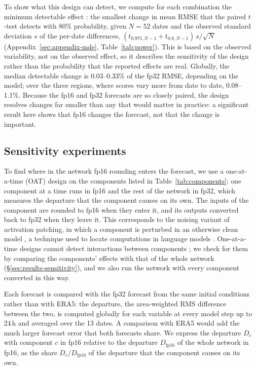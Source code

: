 To show what this design can detect, we compute for each combination
the minimum detectable effect \citep{bloom1995minimum,cohen1988statistical}:
the smallest change in mean RMSE that the paired $t$-test detects with
80\% probability, given $N=52$ dates and the observed standard deviation
$s$ of the per-date differences, $(t_{0.975,N-1}+t_{0.8,N-1})\,s/\sqrt{N}$
(Appendix~\ref{sec:appendix-mde}, Table~\ref{tab:power}). This is based on the observed variability, not
on the observed effect, so it describes the sensitivity of the design
rather than the probability that the reported effects are real.
Globally, the median detectable change is 0.03--0.33\% of the fp32 RMSE,
depending on the model; over the three regions, where scores vary more
from date to date, 0.08--1.1\%. Because the fp16 and fp32 forecasts are
so closely paired, the design resolves changes far smaller than any that
would matter in practice: a significant result here shows that fp16
changes the forecast, not that the change is important.



\subsection{Sensitivity experiments}
\label{sec:methods-tier2}

To find where in the network fp16 rounding enters the forecast, we
use a one-at-a-time (OAT) design on the components listed in
Table~\ref{tab:components}: one component at a time runs in fp16 and the
rest of the network in fp32, which measures the departure that the
component causes on its own. The inputs of the component are rounded to
fp16 when they enter it, and its outputs converted back to fp32 when they
leave it. This corresponds to the noising variant of activation patching, in which a
component is perturbed in an otherwise clean model
\citep{heimersheim2024activation}, a technique used to locate computations
in language models \citep{meng2022locating}. One-at-a-time designs cannot detect
interactions between components \citep{saltelli2010perfunctory}; we
check for them by comparing the components' effects with that of the
whole network (\S\ref{sec:results-sensitivity}), and we also run the
network with every component converted in this way.

Each forecast is compared with the fp32 forecast from the same
initial conditions rather than with ERA5: the departure, the
area-weighted RMS difference between the two, is computed globally for
each variable at every model step up to 24\,h and averaged over the 13
dates. A comparison with ERA5 would add the much larger forecast error
that both forecasts share. We express the departure $D_c$ with component
$c$ in fp16 relative to the departure $D_\mathrm{fp16}$ of the whole
network in fp16, as the share $D_c/D_\mathrm{fp16}$ of the departure that
the component causes on its own.


